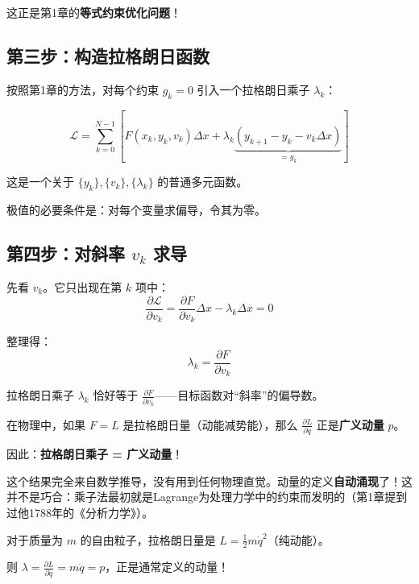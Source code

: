 这正是第1章的\textbf{等式约束优化问题}！

\subsection{第三步：构造拉格朗日函数}

按照第1章的方法，对每个约束 $g_k = 0$ 引入一个拉格朗日乘子 $\lambda_k$：

\begin{equation}
\boxed{
\mathcal{L} = \sum_{k=0}^{N-1} \left[ F(x_k, y_k, v_k) \Delta x + \lambda_k \underbrace{(y_{k+1} - y_k - v_k \Delta x)}_{= g_k} \right]
}
\end{equation}

这是一个关于 $\{y_k\}, \{v_k\}, \{\lambda_k\}$ 的普通多元函数。

极值的必要条件是：对每个变量求偏导，令其为零。

\subsection{第四步：对斜率 $v_k$ 求导}

先看 $v_k$。它只出现在第 $k$ 项中：
\[
\frac{\partial \mathcal{L}}{\partial v_k} = \frac{\partial F}{\partial v_k} \Delta x - \lambda_k \Delta x = 0
\]

整理得：
\begin{equation}
\boxed{\lambda_k = \frac{\partial F}{\partial v_k}}
\end{equation}

\begin{keytheorem}[title=乘子的物理意义]
拉格朗日乘子 $\lambda_k$ 恰好等于 $\frac{\partial F}{\partial v_k}$——目标函数对“斜率”的偏导数。

在物理中，如果 $F = L$ 是拉格朗日量（动能减势能），那么 $\frac{\partial L}{\partial \dot{q}}$ 正是\textbf{广义动量} $p$。

因此：\textbf{拉格朗日乘子 = 广义动量}！
\end{keytheorem}

这个结果完全来自数学推导，没有用到任何物理直觉。动量的定义\textbf{自动涌现}了！这并不是巧合：乘子法最初就是Lagrange为处理力学中的约束而发明的（第1章提到过他1788年的《分析力学》）。

\begin{example}[自由粒子的动量]
对于质量为 $m$ 的自由粒子，拉格朗日量是 $L = \frac{1}{2}m\dot{q}^2$（纯动能）。

则 $\lambda = \frac{\partial L}{\partial \dot{q}} = m\dot{q} = p$，正是通常定义的动量！
\end{example}

